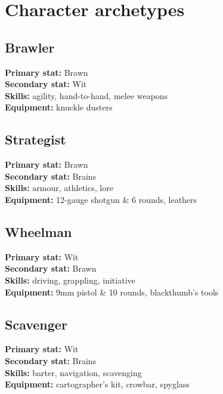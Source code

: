 
\section{Character archetypes}
\begin{multicols}{2}

\subsection{Brawler}
\textbf{Primary stat:} Brawn\\
\textbf{Secondary stat:} Wit\\
\textbf{Skills:} agility, hand-to-hand, melee weapons\\
\textbf{Equipment:} knuckle dusters

\subsection{Strategist}
\textbf{Primary stat:} Brawn\\
\textbf{Secondary stat:} Brains\\
\textbf{Skills:} armour, athletics, lore\\
\textbf{Equipment:} 12-gauge shotgun \& 6 rounds, leathers

\end{multicols}

\begin{multicols}{2}

\subsection{Wheelman}
\textbf{Primary stat:} Wit\\
\textbf{Secondary stat:} Brawn\\
\textbf{Skills:} driving, grappling, initiative\\
\textbf{Equipment:} 9mm pistol \& 10 rounds, blackthumb's tools

\subsection{Scavenger}
\textbf{Primary stat:} Wit\\
\textbf{Secondary stat:} Brains\\
\textbf{Skills:} barter, navigation, scavenging\\
\textbf{Equipment:} cartographer's kit, crowbar, spyglass

\end{multicols}

